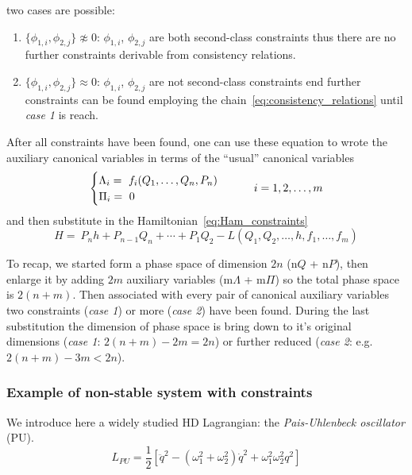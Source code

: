 two cases are possible:

\begin{enumerate}
  \item $\{\phi_{1,i}, \phi_{2,j}\} \not\approx 0$: $\phi_{1,i}$, $\phi_{2,j}$ are
    both second-class constraints thus there are no further constraints
    derivable from consistency relations.
  \item $\{\phi_{1,i}, \phi_{2,j}\} \approx 0$: $\phi_{1,i}$, $\phi_{2,j}$ are
    not second-class constraints end further constraints can be found employing
    the chain~\eqref{eq:consistency_relations} until \emph{case 1} is reach.
\end{enumerate}

After all constraints have been found, one can use these equation to wrote the
auxiliary canonical variables in terms of the ``usual'' canonical variables
\begin{equation} \label{eq:constraints_in_terms_of_canonical_vars}
  \begin{cases}
    \Lambda_i =\ f_i(Q_1, \ldots, Q_n, P_n) \\
    \Pi_i =\ 0
  \end{cases}
  \qquad i = 1, 2, \ldots, m \\
\end{equation}
and then substitute in the Hamiltonian~\eqref{eq:Ham_constraints}
\begin{equation*}
  H =\ P_n h + P_{n-1} Q_n + \cdots + P_1 Q_2
     - L ( Q_1, Q_2, \ldots, h, f_1, \ldots, f_m)
\end{equation*}

To recap, we started form a phase space of dimension $2n$ (n$Q$ + n$P$),
then enlarge it by adding $2m$ auxiliary variables (m$\Lambda$ + m$\Pi$) so
the total phase space is $2(n+m)$. Then associated with every pair of canonical
auxiliary variables two constraints (\emph{case 1}) or more (\emph{case 2}) have
been found.  During the last substitution the dimension of phase space is bring
down to it's original dimensions (\emph{case 1}: $2(n+m) - 2m = 2n$) or further
reduced (\emph{case 2}: e.g. $2(n+m) - 3m < 2n$).

\subsubsection{Example of non-stable system with constraints}
We introduce here a widely studied HD Lagrangian: the
\emph{Pais-Uhlenbeck oscillator} (PU).
\begin{equation} \label{eq:lagrangian_PU}
  L_{PU} = \frac{1}{2} \left[
    \ddot{q}^2 - (\omega_1^2 + \omega_2^2) \dot{q}^2 + \omega_1^2 \omega_2^2 q^2
  \right]
\end{equation}

